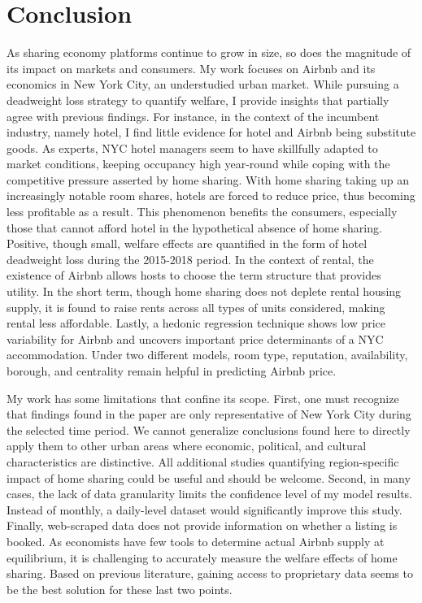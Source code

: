 \documentclass[12pt]{article}
\begin{document}
		
	\section{Conclusion}
		As sharing economy platforms continue to grow in size, so does the magnitude of its impact on markets and consumers. My work focuses on Airbnb and its economics in New York City, an understudied urban market. While pursuing a deadweight loss strategy to quantify welfare, I provide insights that partially agree with previous findings. For instance, in the context of the incumbent industry, namely hotel, I find little evidence for hotel and Airbnb being substitute goods. As experts, NYC hotel managers seem to have skillfully adapted to market conditions, keeping occupancy high year-round while coping with the competitive pressure asserted by home sharing. With home sharing taking up an increasingly notable room shares, hotels are forced to reduce price, thus becoming less profitable as a result. This phenomenon benefits the consumers, especially those that cannot afford hotel in the hypothetical absence of home sharing. Positive, though small, welfare effects are quantified in the form of hotel deadweight loss during the 2015-2018 period. In the context of rental, the existence of Airbnb allows hosts to choose the term structure that provides utility. In the short term, though home sharing does not deplete rental housing supply, it is found to raise rents across all types of units considered, making rental less affordable. Lastly, a hedonic regression technique shows low price variability for Airbnb and uncovers important price determinants of a NYC accommodation. Under two different models, room type, reputation, availability, borough, and centrality remain helpful in predicting Airbnb price.
		
		\par
		My work has some limitations that confine its scope. First, one must recognize that findings found in the paper are only representative of New York City during the selected time period. We cannot generalize conclusions found here to directly apply them to other urban areas where economic, political, and cultural characteristics are distinctive. All additional studies quantifying region-specific impact of home sharing could be useful and should be welcome. Second, in many cases, the lack of data granularity limits the confidence level of my model results. Instead of monthly, a daily-level dataset would significantly improve this study. Finally, web-scraped data does not provide information on whether a listing is booked. As economists have few tools to determine actual Airbnb supply at equilibrium, it is challenging to accurately measure the welfare effects of home sharing. Based on previous literature, gaining access to proprietary data seems to be the best solution for these last two points.
		
\end{document}
